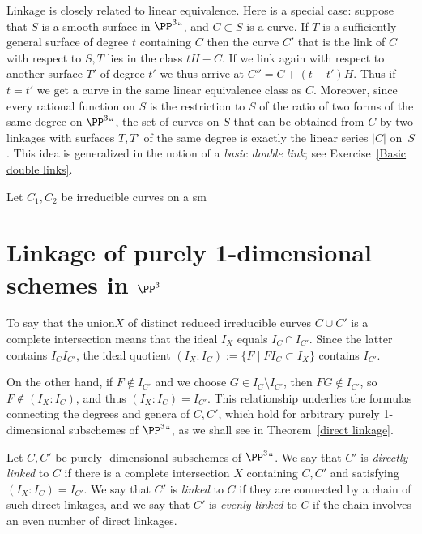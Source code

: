 \begin{remark}
Linkage is closely related to linear equivalence.
%
Here is a special case:
suppose that $S$ is a smooth surface in $\PP^3` `$, and $C\subset S$
is a curve. If $T$ is a sufficiently general surface of degree $t$
containing $C$ then the curve $C'$ that is the link of $C$ with respect
to $S,T$ lies in the class $tH-C$. If we link again with
respect to another surface $T'$ of degree $t'$ we thus arrive at $C''
= C+(t-t')H$. Thus if $t=t'$ we get a curve in the same
linear equivalence class as $C$. Moreover, since every rational function
on $S$ is the restriction to $S$ of the ratio of two forms of the same
degree on $\PP^3` `$,
the set of curves on $S$ that can be obtained from $C$ by two linkages
with surfaces $T, T'$ of the same degree is exactly the
linear series $|C|$ on~$S$. This idea is generalized in the notion of
a \emph{basic double link}; see
%
Exercise~\ref{Basic double links}.
\end{remark}

\begin{exercise}
Let $C_{1}, C_{2}$ be irreducible curves on a sm
\end{exercise}
\section{Linkage of purely 1-dimensional schemes in $\PP^3$}
To say that the union$X$  of distinct reduced irreducible curves $C\cup C'$
is a complete intersection means that
the ideal $I_X $
equals
$I_C\cap I_{C'}$. Since
the latter
contains
$I_CI_{C'}$, the ideal quotient
$(I_X:I_C) := \{F \mid FI_C\subset I_X\}$
contains $I_{C'}$.

On the other hand, if $F \notin I_{C'}$ and we choose $G\in I_C\setminus
I_{C'}$, then $FG\notin I_{C'}$, so
$F\notin (I_X:I_C)$, and thus
$(I_X:I_C) = I_{C'}$.
This
relationship
underlies
the formulas connecting the degrees and genera of $C,C'$, which hold
for arbitrary purely 1-dimensional subschemes of $\PP^3` `$, as we shall see in Theorem~\ref{direct linkage}.

\begin{definition}\label{linkage def}
Let $C,C'$ be purely \1-dimensional subschemes of $\PP^3` `$. We say that
$C'$ is \emph{directly linked} to $C$ if there is a complete
intersection $X$ containing $C,C'$ and
satisfying
$(I_X:I_C) = I_{C'}$. We say that
$C'$ is \emph{linked} to $C$ if they are connected by a chain of such
%
%
direct linkages, and we say that $C'$ is \emph{evenly linked} to $C$
if the chain involves an even number of direct linkages.
\unif
\end{definition}

